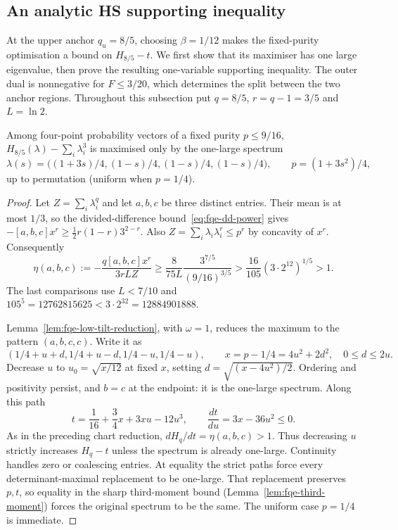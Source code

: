 \subsection{An analytic HS supporting inequality}\label{sec:fqe-hs-polynomial}

At the upper anchor $q_u=8/5$, choosing $\beta=1/12$ makes the
fixed-purity optimisation a bound on $H_{8/5}-t$. We first show that its
maximiser has one large eigenvalue, then prove the resulting one-variable
supporting inequality. The outer dual is nonnegative for $F\le3/20$,
which determines the split between the two anchor regions.
Throughout this subsection put $q=8/5$, $r=q-1=3/5$ and $L=\ln2$.

\begin{lemma}\label{lem:fqe-hs-tilt}
Among four-point probability vectors of a fixed purity $p\le9/16$,
$H_{8/5}(\lambda)-\sum_i\lambda_i^3$ is maximised only by the one-large spectrum
\[
 \lambda(s)=\bigl((1+3s)/4,(1-s)/4,(1-s)/4,(1-s)/4\bigr),
 \qquad p=(1+3s^2)/4,
\]
up to permutation (uniform when $p=1/4$).
\end{lemma}
\begin{proof}
Let $Z=\sum_i\lambda_i^q$ and let $a,b,c$ be three distinct entries.
Their mean is at most $1/3$, so the divided-difference bound~\eqref{eq:fqe-dd-power} gives
$-[a,b,c]x^r\ge\frac12r(1-r)3^{2-r}$. Also
$Z=\sum_i\lambda_i\lambda_i^r\le p^r$ by concavity of $x^r$.
Consequently
\[
 \eta(a,b,c):=-\frac{q[a,b,c]x^r}{3rLZ}
 \ge\frac8{75L}\frac{3^{7/5}}{(9/16)^{3/5}}
 >\frac{16}{105}(3\cdot2^{12})^{1/5}>1.
 \tag{HTS}\label{eq:fqe-hs-tilt-slope}
\]
The last comparisons use $L<7/10$ and
$105^5=12762815625<3\cdot2^{32}=12884901888$.

Lemma~\ref{lem:fqe-low-tilt-reduction}, with $\omega=1$, reduces the maximum
to the pattern $(a,b,c,c)$. Write it as
\[
 (1/4+u+d,1/4+u-d,1/4-u,1/4-u),\qquad
 x=p-1/4=4u^2+2d^2,\quad 0\le d\le2u.
\]
Decrease $u$ to $u_0=\sqrt{x/12}$ at fixed $x$, setting
$d=\sqrt{(x-4u^2)/2}$. Ordering and positivity persist, and $b=c$ at
the endpoint: it is the one-large spectrum.
Along this path
\[
 t=\frac1{16}+\frac34x+3xu-12u^3,\qquad
 \frac{dt}{du}=3x-36u^2\le0.
\]
As in the preceding chart reduction, $dH_q/dt=\eta(a,b,c)>1$.
Thus decreasing $u$ strictly increases $H_q-t$ unless the spectrum
is already one-large. Continuity handles zero or coalescing entries.
At equality the strict paths force every determinant-maximal replacement to be
one-large. That replacement preserves $p,t$, so equality in the sharp third-moment bound
(Lemma~\ref{lem:fqe-third-moment}) forces the original spectrum to be the same.
The uniform case $p=1/4$ is immediate.
\end{proof}

